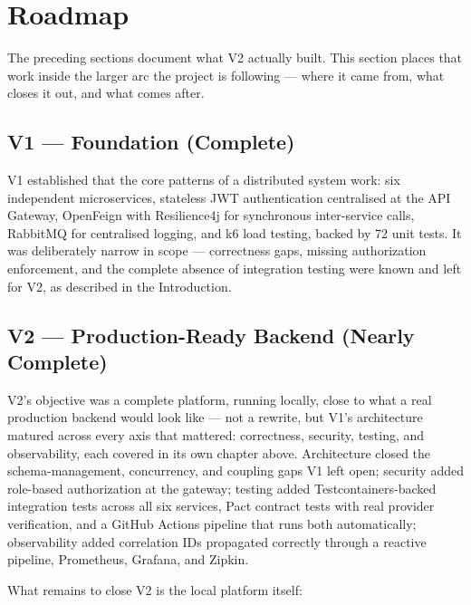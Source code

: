 \section{Roadmap}

The preceding sections document what V2 actually built. This section places that work inside the larger arc the project is following --- where it came from, what closes it out, and what comes after.

\subsection{V1 --- Foundation (Complete)}

V1 established that the core patterns of a distributed system work: six independent microservices, stateless JWT authentication centralised at the API Gateway, OpenFeign with Resilience4j for synchronous inter-service calls, RabbitMQ for centralised logging, and k6 load testing, backed by 72 unit tests. It was deliberately narrow in scope --- correctness gaps, missing authorization enforcement, and the complete absence of integration testing were known and left for V2, as described in the Introduction.

\subsection{V2 --- Production-Ready Backend (Nearly Complete)}

V2's objective was a complete platform, running locally, close to what a real production backend would look like --- not a rewrite, but V1's architecture matured across every axis that mattered: correctness, security, testing, and observability, each covered in its own chapter above. Architecture closed the schema-management, concurrency, and coupling gaps V1 left open; security added role-based authorization at the gateway; testing added Testcontainers-backed integration tests across all six services, Pact contract tests with real provider verification, and a GitHub Actions pipeline that runs both automatically; observability added correlation IDs propagated correctly through a reactive pipeline, Prometheus, Grafana, and Zipkin.

What remains to close V2 is the local platform itself:

